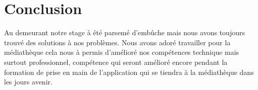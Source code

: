 \documentclass[14pt,a4paper]{article}
\begin{document}
\section{Conclusion}
Au demeurant notre stage à été parsemé d’embûche mais nous avons
toujours trouvé des solutions à nos problèmes. Nous avons adoré travailler pour
la médiathèque cela nous à permis d'amélioré nos compétences technique mais surtout professionnel,
compétence qui seront amélioré encore pendant la formation de prise en main de l'application qui se
tiendra à la médiathèque dans les jours avenir.
\end{document}
